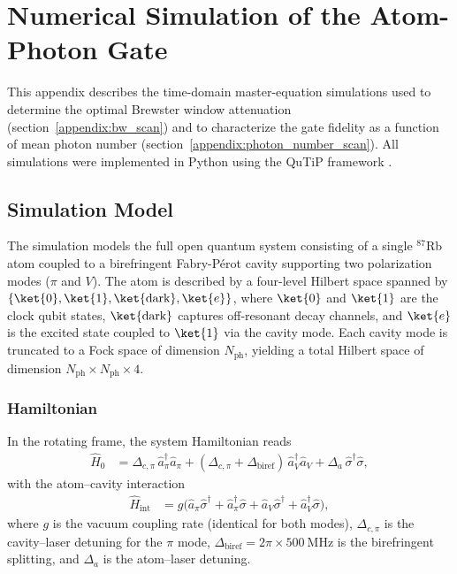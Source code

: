 \chapter{Numerical Simulation of the Atom-Photon Gate}\label{appendix:qutip_simulation}

This appendix describes the time-domain master-equation simulations used to determine the optimal Brewster window attenuation (section~\ref{appendix:bw_scan}) and to characterize the gate fidelity as a function of mean photon number (section~\ref{appendix:photon_number_scan}). All simulations were implemented in Python using the QuTiP framework \cite{qutip5}.

\section{Simulation Model}\label{appendix:sim_model}

The simulation models the full open quantum system consisting of a single $^{87}$Rb atom coupled to a birefringent Fabry-P\'{e}rot cavity supporting two polarization modes ($\pi$ and $V$). The atom is described by a four-level Hilbert space spanned by $\{\ket{0}, \ket{1}, \ket{\text{dark}}, \ket{e}\}$, where $\ket{0}$ and $\ket{1}$ are the clock qubit states, $\ket{\text{dark}}$ captures off-resonant decay channels, and $\ket{e}$ is the excited state coupled to $\ket{1}$ via the cavity mode. Each cavity mode is truncated to a Fock space of dimension $N_{\text{ph}}$, yielding a total Hilbert space of dimension $N_{\text{ph}} \times N_{\text{ph}} \times 4$.

\subsection{Hamiltonian}

In the rotating frame, the system Hamiltonian reads
\begin{align}
	\hat{H}_0 & = \Delta_{c,\pi}\, \hat{a}_\pi^\dagger \hat{a}_\pi + (\Delta_{c,\pi} + \Delta_{\text{biref}})\, \hat{a}_V^\dagger \hat{a}_V + \Delta_a\, \hat{\sigma}^\dagger \hat{\sigma},
\end{align}
with the atom--cavity interaction
\begin{align}
	\hat{H}_{\text{int}} & = g\bigl(\hat{a}_\pi \hat{\sigma}^\dagger + \hat{a}_\pi^\dagger \hat{\sigma} + \hat{a}_V \hat{\sigma}^\dagger + \hat{a}_V^\dagger \hat{\sigma}\bigr),
\end{align}
where $g$ is the vacuum coupling rate (identical for both modes), $\Delta_{c,\pi}$ is the cavity--laser detuning for the $\pi$ mode, $\Delta_{\text{biref}} = 2\pi \times \SI{500}{\mega\hertz}$ is the birefringent splitting, and $\Delta_a$ is the atom--laser detuning.

